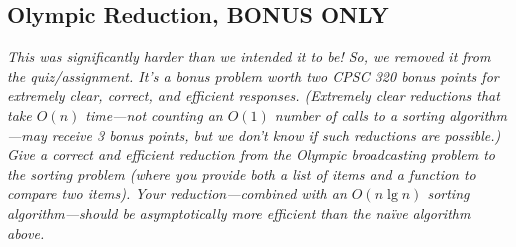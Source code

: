 \documentclass[11pt, oneside]{article}   	%
\theoremstyle{definition}
\theoremstyle{remark}
\begin{document}
\subsection{Olympic Reduction, BONUS ONLY}
\textit{This was significantly harder than we intended it to be! So, we removed it from the quiz/assignment. It's a bonus problem worth two CPSC 320 bonus points for extremely clear, correct, and efficient responses. (Extremely clear reductions that take $O(n)$ time---not counting an $O(1)$ number of calls to a sorting algorithm---may receive 3 bonus points, but we don't know if such reductions are possible.) Give a correct and efficient reduction from the Olympic broadcasting problem to the sorting problem (where you provide both a list of items and a function to compare two items). Your reduction---combined with an $O(n \lg n)$ sorting algorithm---should be asymptotically more efficient than the na\"ive algorithm above.}

%
%
%    
%      
%      
%      
%    
\end{document}

